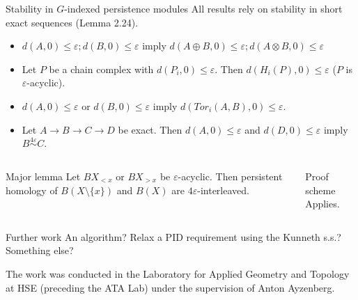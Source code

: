 \documentclass[usenames,dvipsnames]{beamer}
\begin{document}
\begin{frame}{}
\begin{columns}[t]
\begin{column}{.38\linewidth}
        \begin{block}{Stability in $G$-indexed persistence modules}
          All results rely on stability in short exact sequences (Lemma 2.24).\par
          \begin{itemize}
          \item $d(A, 0) \leq \varepsilon; d(B, 0) \leq \varepsilon$ imply $d(A \oplus B, 0) \leq \varepsilon; d(A \otimes B, 0) \leq \varepsilon$
          \item Let $P$ be a chain complex with $d(P_i,0) \leq \varepsilon$. Then $d(H_i(P),0) \leq \varepsilon$ ($P$ is $\varepsilon$-acyclic).
          \item $d(A,0) \leq \varepsilon$ or $d(B,0) \leq \varepsilon$ imply $d(Tor_i(A,B),0) \leq \varepsilon$.
          \item Let $A \to B \to C \to D$ be exact. Then $d(A,0) \leq \varepsilon$ and $d(D,0) \leq \varepsilon$ imply $B \stackrel{4\varepsilon}{\sim} C$.
          \end{itemize}
        \end{block}
      \end{column}
    \end{columns}
    \begin{columns}[t]
      \begin{column}{.70\linewidth}
        \begin{block}{Major lemma}
          Let $BX_{< x}$ or $BX_{> x}$ be $\varepsilon$-acyclic. Then persistent homology of $B(X \setminus \{x\})$ and $B(X)$ are $4\varepsilon$-interleaved.
        \end{block}
      \end{column}
      \begin{column}{.13\linewidth}
        \begin{block}{Proof scheme}
          \centering
          Applies.
        \end{block}
      \end{column}
    \end{columns}
    \begin{block}{Further work}
      \centering
      An algorithm? Relax a PID requirement using the Kunneth s.s.? Something else?
    \end{block}
    \centering
    {\small The work was conducted in the Laboratory for Applied Geometry and Topology at HSE (preceding the ATA Lab) under the supervision of Anton Ayzenberg.}  
  \end{frame}
\end{document}
